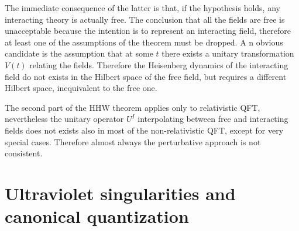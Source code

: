 \documentclass[../main/main.tex]{subfiles}
\begin{document}
The immediate consequence of the latter is that, if the hypothesis holds, any interacting theory is actually free. The conclusion that all the fields are free is unacceptable because the intention is to represent an interacting field, therefore at least one of the assumptions of the theorem must be dropped. A n obvious candidate is the assumption that at some $t$ there exists a unitary transformation $V(t)$ relating the fields. Therefore the Heisenberg dynamics of the interacting field do not exists in the Hilbert space of the free field, but requires a different Hilbert space, inequivalent to the free one.  


The second part of the HHW theorem applies only to relativistic QFT, nevertheless the unitary operator $U^I$ interpolating between free and interacting fields does not exists also in most of the non-relativistic QFT, except for very special cases. Therefore almost always the perturbative approach is not consistent. 

\section{Ultraviolet singularities and canonical quantization}

\cite[Section 2.4]{Strocchi_2013}\\
\end{document}
